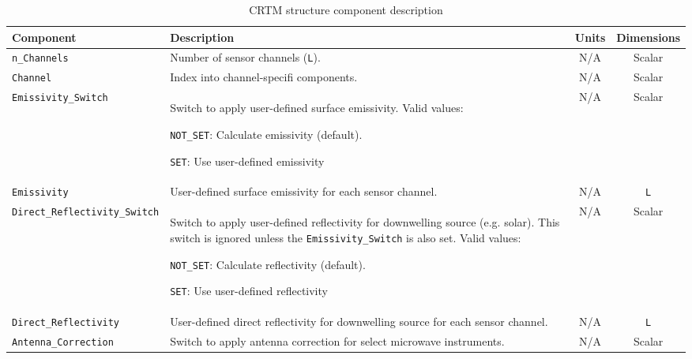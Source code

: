 \begin{table}[htp]
  \centering
  \begin{tabular}{l p{7cm} c c}
    \hline
    \sffamily\textbf{Component} & \sffamily\textbf{Description} & \sffamily\textbf{Units} & \sffamily\textbf{Dimensions} \\
    \hline\hline
    \texttt{n\_Channels}                  & Number of sensor channels (\texttt{L}). & N/A & Scalar \\
    \texttt{Channel}                      & Index into channel-specifi components. & N/A & Scalar \\
    \texttt{Emissivity\_Switch}           & Switch to apply user-defined surface emissivity. Valid values:

    \parbox{7cm}{\hspace{0.5cm}\texttt{NOT\_SET}: Calculate emissivity (default).
    
                 \hspace{0.5cm}\texttt{SET}: Use user-defined emissivity}
     & N/A & Scalar \\
    \texttt{Emissivity}                   & User-defined surface emissivity for each sensor channel. & N/A & \texttt{L} \\
    \texttt{Direct\_Reflectivity\_Switch} & Switch to apply user-defined reflectivity for downwelling source (e.g. solar). This switch is ignored unless the \texttt{Emissivity\_Switch} is also set. Valid values:

    \parbox{7cm}{\hspace{0.5cm}\texttt{NOT\_SET}: Calculate reflectivity (default).
    
                 \hspace{0.5cm}\texttt{SET}: Use user-defined reflectivity}
     & N/A & Scalar \\
    \texttt{Direct\_Reflectivity}         & User-defined direct reflectivity for downwelling source for each sensor channel. & N/A & \texttt{L} \\
    \texttt{Antenna\_Correction}          & Switch to apply antenna correction for select microwave instruments. & N/A & Scalar \\
    \hline
  \end{tabular}
  \caption{CRTM \Options{} structure component description}
  \label{tab:options_structure}
\end{table}

